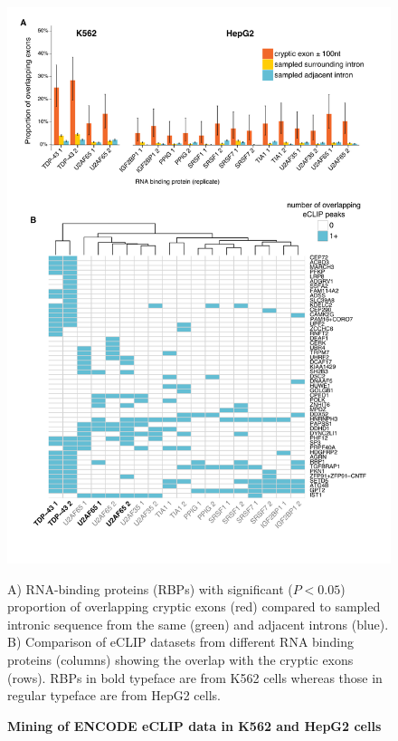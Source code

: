 \begin{figure}[h!]
	\centering
		\includegraphics[width=\textwidth]{Figures/03_cryptic_exons/Figure_7_ENCODE_mining.png}
	\caption{\textbf{Mining of ENCODE eCLIP data in K562 and HepG2 cells}}
		A) RNA-binding proteins (RBPs) with significant ($P < 0.05$) proportion of overlapping cryptic exons (red) compared to sampled intronic sequence from the same (green) and adjacent introns (blue). B) Comparison of eCLIP datasets from different RNA binding proteins (columns) showing the overlap with the cryptic exons (rows). RBPs in bold typeface are from K562 cells whereas those in regular typeface are from HepG2 cells.
		\label{fig:cryptic_mining}
\end{figure}

